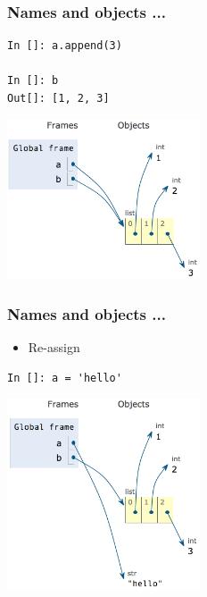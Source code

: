 \documentclass[14pt,compress,aspectratio=169]{beamer}
\begin{document}
\begin{frame}[fragile]
  \frametitle{Names and objects ...}
  \begin{minipage}{0.4\textwidth}
  \begin{lstlisting}
In []: a.append(3)

In []: b
Out[]: [1, 2, 3]
  \end{lstlisting}
\end{minipage}
  \begin{minipage}{0.4\textwidth}
    \hspace*{0.4in}\includegraphics[width=2.25in]{data/a_b_list1.png}
  \end{minipage}

\end{frame}

\begin{frame}[fragile]
  \frametitle{Names and objects ...}
  \begin{minipage}{0.4\textwidth}
  \begin{itemize}
  \item Re-assign 
  \end{itemize}
  \begin{lstlisting}
In []: a = 'hello'
\end{lstlisting}
\pause
\end{minipage}
  \begin{minipage}{0.4\textwidth}
    \hspace*{0.4in}\includegraphics[width=2.25in]{data/a_str_b_list.png}
  \end{minipage}
\end{frame}
\end{document}
